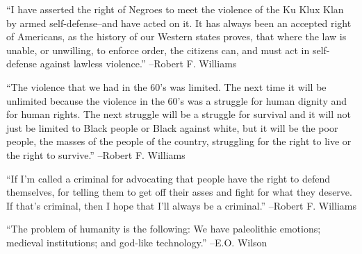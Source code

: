 \documentclass{article}%
\begin{document}
\linebreak%
\vspace{1mm}%
\begin{minipage}{\textwidth}%
\flushleft%
“I have asserted the right of Negroes to meet the violence of the Ku Klux Klan by armed self{-}defense–and have acted on it. It has always been an accepted right of Americans, as the history of our Western states proves, that where the law is unable, or unwilling, to enforce order, the citizens can, and must act in self{-}defense against lawless violence.”%
\linebreak%
\vspace{1mm}%
–Robert F. Williams%
\linebreak%
\vspace{1mm}%
\end{minipage}%
\linebreak%
\vspace{1mm}%
\begin{minipage}{\textwidth}%
\flushleft%
“The violence that we had in the 60's was limited. The next time it will be unlimited because the violence in the 60's was a struggle for human dignity and for human rights. The next struggle will be a struggle for survival and it will not just be limited to Black people or Black against white, but it will be the poor people, the masses of the people of the country, struggling for the right to live or the right to survive.”%
\linebreak%
\vspace{1mm}%
–Robert F. Williams%
\linebreak%
\vspace{1mm}%
\end{minipage}%
\linebreak%
\vspace{1mm}%
\begin{minipage}{\textwidth}%
\flushleft%
“If I'm called a criminal for advocating that people have the right to defend themselves, for telling them to get off their asses and fight for what they deserve. If that's criminal, then I hope that I'll always be a criminal.”%
\linebreak%
\vspace{1mm}%
–Robert F. Williams%
\linebreak%
\vspace{1mm}%
\end{minipage}%
\linebreak%
\vspace{1mm}%
\begin{minipage}{\textwidth}%
\flushleft%
“The problem of humanity is the following: We have paleolithic emotions; medieval institutions; and god{-}like technology.”%
\linebreak%
\vspace{1mm}%
–E.O. Wilson%
\linebreak%
\vspace{1mm}%
\end{minipage}%
\end{document}

